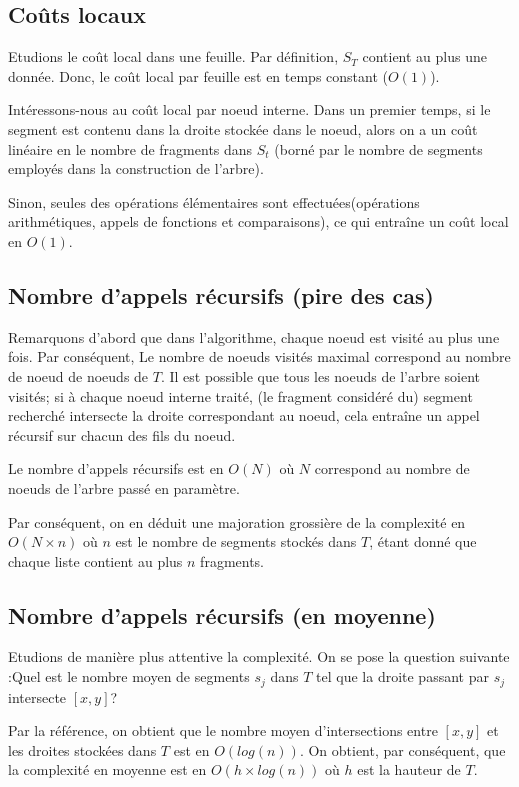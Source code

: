 \subsection{Coûts locaux}
Etudions le coût local dans une feuille.
Par définition, $S_T$ contient au plus une donnée.
Donc, le coût local par feuille est en temps constant ($O(1)$).

Intéressons-nous au coût local par noeud interne.
Dans un premier temps, si le segment est contenu dans
la droite stockée dans le noeud, alors on a un coût linéaire
en le nombre de fragments dans $S_t$ (borné par le nombre de
segments employés dans la construction de l'arbre).

Sinon, seules des opérations élémentaires sont
effectuées(opérations arithmétiques, appels de fonctions
et comparaisons), ce qui entraîne un coût local en $O(1)$.
\subsection{Nombre d'appels récursifs (pire des cas)}
Remarquons d'abord que dans l'algorithme, chaque noeud est
visité au plus une fois.
Par conséquent, Le nombre de noeuds visités maximal correspond
au nombre de noeud de noeuds de $T$.
Il est possible que tous les noeuds de l'arbre soient visités;
si à chaque noeud interne traité, (le fragment considéré du) segment
recherché intersecte la droite correspondant au noeud, cela entraîne
un appel récursif sur chacun des fils du noeud.

Le nombre d'appels récursifs est en $O(N)$ où $N$ correspond
au nombre de noeuds de l'arbre passé en paramètre.

Par conséquent, on en déduit une majoration grossière de
la complexité en $O(N \times n)$ où $n$ est le nombre de
segments stockés dans $T$, étant donné que chaque liste contient
au plus $n$ fragments.

\subsection{Nombre d'appels récursifs (en moyenne)}
Etudions de manière plus attentive la complexité. On se pose la
question suivante :\og Quel est le nombre moyen de segments
$s_j$ dans $T$ tel que la droite passant par $s_j$ intersecte
$[x,y]$?\fg


Par la référence, on obtient que le nombre moyen d'intersections entre $[x,y]$ et les droites
stockées dans $T$ est en $O(log (n))$. On obtient, par conséquent, que la complexité en moyenne
est en $O(h \times log (n))$ où $h$ est la hauteur de $T$.